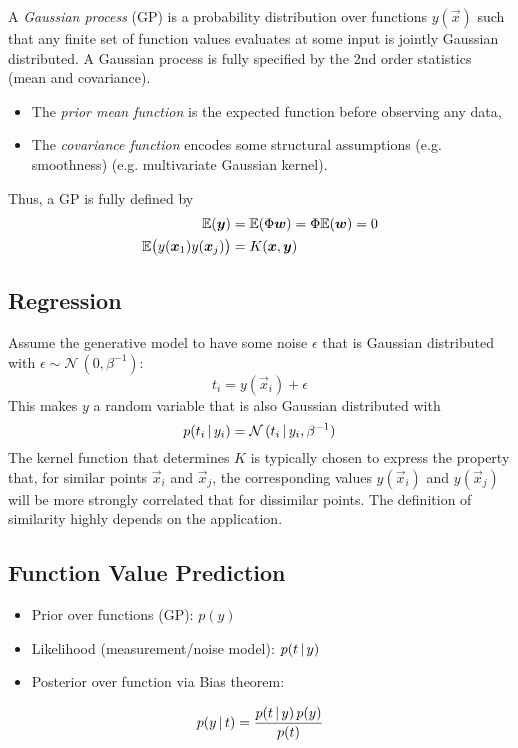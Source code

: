 		A \emph{Gaussian process} (GP) is a probability distribution over functions \(y(\vec{x})\) such that any finite set of function values evaluates at some input is jointly Gaussian distributed. A Gaussian process is fully specified by the 2nd order statistics (mean and covariance).
		\begin{itemize}
			\item The \emph{prior mean function} is the expected function before observing any data,
			\item The \emph{covariance function} encodes some structural assumptions (e.g. smoothness) (e.g. multivariate Gaussian kernel).
		\end{itemize}
		Thus, a GP is fully defined by
		\begin{align}
			\mathbb{E}(\bm{y}) &= \mathbb{E}(\Phi\bm{w}) = \Phi \mathbb{E}(\bm{w}) = 0 \\
			\mathbb{E}\big( y(\bm{x}_1) y(\bm{x}_j) \big) &= K(\bm{x}, \bm{y})
		\end{align}

		\subsection{Regression}
			Assume the generative model to have some noise \(\epsilon\) that is Gaussian distributed with \( \epsilon \sim \mathcal{N}\,(0, \beta^{-1}) \):
			\begin{equation}
				t_i = y(\vec{x}_i) + \epsilon
			\end{equation}
			This makes \(y\) a random variable that is also Gaussian distributed with
			\begin{equation}
				p(t_i \,\vert\, y_i) = \mathcal{N}\,(t_i \,\vert\, y_i, \beta^{-1})
			\end{equation}
			The kernel function that determines \(K\) is typically chosen to express the property that, for similar points \( \vec{x}_i \) and \( \vec{x}_j \), the corresponding values \( y(\vec{x}_i) \) and \( y(\vec{x}_j) \) will be more strongly correlated that for dissimilar points. The definition of similarity highly depends on the application.

		\subsection{Function Value Prediction}
			\begin{itemize}
				\item Prior over functions (GP): \( p(y) \)
				\item Likelihood (measurement/noise model): \( p(t \,\vert\, y) \)
				\item Posterior over function via Bias theorem:
			\end{itemize}
			\begin{equation}
				p(y \,\vert\, t) = \frac{p(t \,\vert\, y) \, p(y)}{p(t)}
			\end{equation}
			
